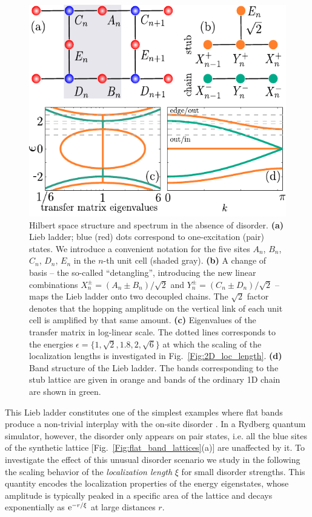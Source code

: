\documentclass[prl,aps,twocolumn,showpacs,superscriptaddress,longbibliography]{revtex4-1}
\newcommand{\rme}[1]{{\rm{e}}^{#1}}
\begin{document}
\begin{figure}
\includegraphics[width=\columnwidth]{Figure2.pdf}
\caption{Hilbert space structure and spectrum in the absence of disorder. \textbf{(a)} Lieb ladder; blue (red) dots correspond to one-excitation (pair) states. We introduce a convenient notation for the five sites $A_n$, $B_n$, $C_n$, $D_n$, $E_n$ in the $n$-th unit cell (shaded gray). \textbf{(b)} A change of basis -- the so-called ``detangling'', introducing the new linear combinations $X_n^\pm = (A_n \pm B_n)/\sqrt{2}$ and $Y_n^\pm = (C_n \pm D_n)/\sqrt{2}$ \cite{a_Flach_EPL_14,Leykam2017} -- maps the Lieb ladder onto two decoupled chains. The $\sqrt{2}$ factor denotes that the hopping amplitude on the vertical link of each unit cell is amplified by that same amount. \textbf{(c)} Eigenvalues of the transfer matrix in log-linear scale. The dotted lines corresponds to the energies $\epsilon = \{1, \sqrt 2, 1.8, 2, \sqrt 6\}$ at which the scaling of the localization lengths is investigated in Fig.~\ref{Fig:2D_loc_length}. \textbf{(d)} Band structure of the Lieb ladder. The bands corresponding to the stub lattice are given in orange and bands of the ordinary 1D chain are shown in green.}
\label{Fig:decoupling}
\end{figure}

This Lieb ladder constitutes one of the simplest examples where flat bands produce a non-trivial interplay with the on-site disorder \cite{Leykam2017}. In a Rydberg quantum simulator, however, the disorder only appears on pair states, i.e. all the blue sites of the synthetic lattice [Fig.~\ref{Fig:flat_band_lattices}(a)] are unaffected by it. To investigate the effect of this unusual disorder scenario we study in the following the scaling behavior of the \emph{localization length} $\xi$ for small disorder strengths. This quantity encodes the localization properties of the energy eigenstates, whose amplitude is typically peaked in a specific area of the lattice and decays exponentially as $\rme{-r/\xi}$ at large distances $r$.
\end{document}
